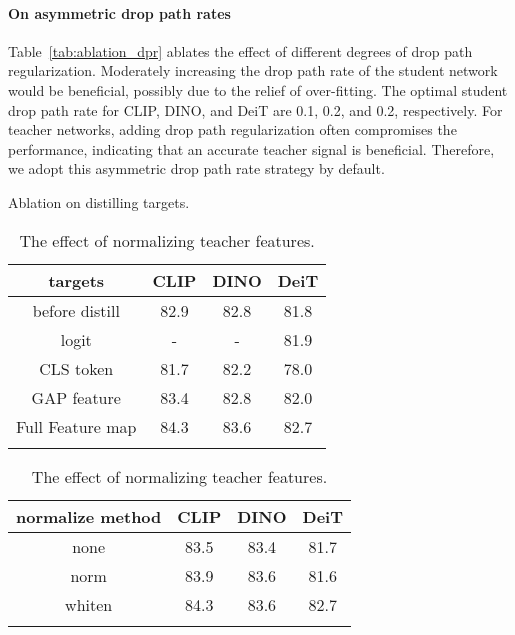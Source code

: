\documentclass{article}
\begin{document}
\paragraph{On asymmetric drop path rates} Table~\ref{tab:ablation_dpr} ablates the effect of different degrees of drop path regularization. Moderately increasing the drop path rate of the student network would be beneficial, possibly due to the relief of over-fitting. The optimal student drop path rate for CLIP, DINO, and DeiT are 0.1, 0.2, and 0.2, respectively. For teacher networks, adding drop path regularization often compromises the performance, indicating that an accurate teacher signal is beneficial. Therefore, we adopt this asymmetric drop path rate strategy by default.


\begin{table}[t]
    \begin{minipage}{0.49\linewidth}
    \centering
    \addtolength{\tabcolsep}{-1pt}
    \caption{Ablation on distilling targets.}
    \begin{tabular}{c|ccc}
        \Xhline{2\arrayrulewidth}
            targets & CLIP & DINO & DeiT \\
            \hline
            before distill & 82.9 & 82.8 & 81.8 \\
            \hline
            logit & - & - & 81.9 \\
            CLS token & 81.7 & 82.2 &  78.0 \\
            GAP feature & 83.4 & 82.8 &  82.0 \\
            Full Feature map & 84.3 & 83.6 & 82.7 \\
            \Xhline{2\arrayrulewidth}
    \end{tabular}
    \label{tab:ablation_targets}
    
    \vspace{1em}
    
    \addtolength{\tabcolsep}{-1pt}
    \caption{The effect of normalizing teacher features.}
    \begin{tabular}{c|ccc}
        \Xhline{2\arrayrulewidth}
            normalize method & CLIP & DINO & DeiT \\
            \hline
            none & 83.5 & 83.4 & 81.7  \\
             norm & 83.9 & 83.6 & 81.6  \\
            whiten & 84.3 & 83.6 & 82.7 \\
            \Xhline{2\arrayrulewidth}
    \end{tabular}
    \label{tab:ablation_normalization}
        

\end{minipage}
\end{table}
\end{document}
